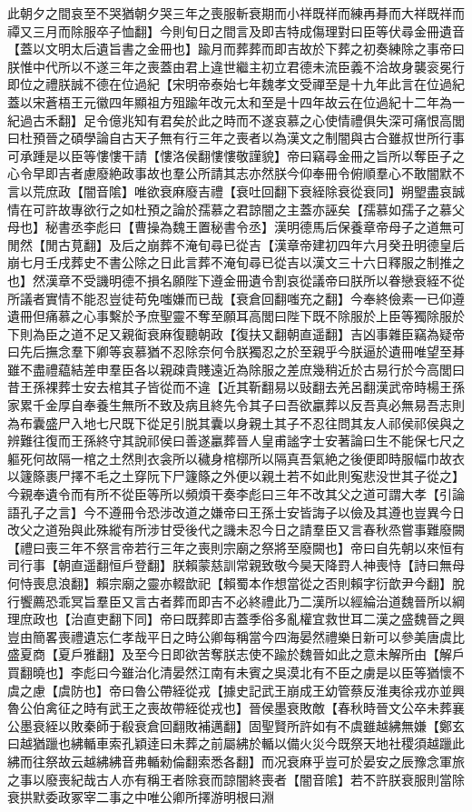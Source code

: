 此朝夕之間哀至不哭猶朝夕哭三年之喪服斬衰期而小祥既祥而練再朞而大祥既祥而禫又三月而除服卒子恤翻】今則旬日之間言及即吉特成傷理對曰臣等伏尋金冊遺音【蓋以文明太后遺旨書之金冊也】踰月而葬葬而即吉故於下葬之初奏練除之事帝曰朕惟中代所以不遂三年之喪蓋由君上違世繼主初立君德未流臣義不洽故身襲衮冕行即位之禮朕誠不德在位過紀【宋明帝泰始七年魏孝文受禪至是十九年此言在位過紀蓋以宋蒼梧王元徽四年顯祖方殂踰年改元太和至是十四年故云在位過紀十二年為一紀過古禾翻】足令億兆知有君矣於此之時而不遂哀慕之心使情禮俱失深可痛恨高閭曰杜預晉之碩學論自古天子無有行三年之喪者以為漢文之制闇與古合雖叔世所行事可承踵是以臣等慺慺干請【慺洛侯翻慺慺敬謹貌】帝曰竊尋金冊之旨所以奪臣子之心令早即吉者慮廢絶政事故也羣公所請其志亦然朕今仰奉冊令俯順羣心不敢闇默不言以荒庶政【闇音隂】唯欲衰麻廢吉禮【衰吐回翻下衰絰除衰從衰同】朔朢盡哀誠情在可許故專欲行之如杜預之論於孺慕之君諒闇之主蓋亦誣矣【孺慕如孺子之慕父母也】秘書丞李彪曰【曹操為魏王置秘書令丞】漢明德馬后保養章帝母子之道無可閒然【閒古莧翻】及后之崩葬不淹旬尋已從吉【漢章帝建初四年六月癸丑明德皇后崩七月壬戌葬史不書公除之日此言葬不淹旬尋已從吉以漢文三十六日釋服之制推之也】然漢章不受譏明德不損名願陛下遵金冊遺令割哀從議帝曰朕所以眷戀衰絰不從所議者實情不能忍豈徒苟免嗤嫌而已哉【衰倉回翻嗤充之翻】今奉終儉素一已仰遵遺冊但痛慕之心事繫於予庶聖靈不奪至願耳高閭曰陛下既不除服於上臣等獨除服於下則為臣之道不足又親䘖衰麻復聽朝政【復扶又翻朝直遥翻】吉凶事雜臣竊為疑帝曰先后撫念羣下卿等哀慕猶不忍除奈何令朕獨忍之於至親乎今朕逼於遺冊唯望至朞雖不盡禮藴結差申羣臣各以親疎貴賤遠近為除服之差庶幾稍近於古易行於今高閭曰昔王孫裸葬士安去棺其子皆從而不違【近其靳翻易以䜴翻去羌呂翻漢武帝時楊王孫家累千金厚自奉養生無所不致及病且終先令其子曰吾欲臝葬以反吾真必無易吾志則為布囊盛尸入地七尺既下從足引脱其囊以身親土其子不忍往問其友人祁侯祁侯與之辨難往復而王孫終守其說祁侯曰善遂臝葬晉人皇甫謐字士安著論曰生不能保七尺之軀死何故隔一棺之土然則衣衾所以穢身棺槨所以隔真吾氣絶之後便即時服幅巾故衣以籧篨裹尸擇不毛之土穿阮下尸籧篨之外便以親土若不如此則寃悲没世其子從之】今親奉遺令而有所不從臣等所以頻煩干奏李彪曰三年不改其父之道可謂大孝【引論語孔子之言】今不遵冊令恐涉改道之嫌帝曰王孫士安皆誨子以儉及其遵也豈異今日改父之道殆與此殊縱有所涉甘受後代之譏未忍今日之請羣臣又言春秋烝嘗事難廢闕【禮曰喪三年不祭言帝若行三年之喪則宗廟之祭將至廢闕也】帝曰自先朝以來恒有司行事【朝直遥翻恒戶登翻】朕賴蒙慈訓常親致敬今昊天降罸人神喪恃【詩曰無母何恃喪息浪翻】賴宗廟之靈亦輟歆祀【賴蜀本作想當從之否則賴字衍歆尹今翻】脫行饗薦恐乖冥旨羣臣又言古者葬而即吉不必終禮此乃二漢所以經綸治道魏晉所以綱理庶政也【治直吏翻下同】帝曰既葬即吉蓋季俗多亂權宜救世耳二漢之盛魏晉之興豈由簡畧喪禮遺忘仁孝哉平日之時公卿每稱當今四海晏然禮樂日新可以參美唐虞比盛夏商【夏戶雅翻】及至今日即欲苦奪朕志使不踰於魏晉如此之意未解所由【解戶買翻曉也】李彪曰今雖治化清晏然江南有未賓之吳漠北有不臣之虜是以臣等猶懷不虞之慮【虞防也】帝曰魯公帶絰從戎【據史記武王崩成王幼管蔡反淮夷徐戎亦並興魯公伯禽征之時有武王之喪故帶絰從戎也】晉侯墨衰敗敵【春秋時晉文公卒未葬襄公墨衰絰以敗秦師于殽衰倉回翻敗補邁翻】固聖賢所許如有不虞雖越紼無嫌【鄭玄曰越猶躐也紼輴車索孔穎逹曰未葬之前屬紼於輴以備火災今既祭天地社稷須越躐此紼而往祭故云越紼紼音弗輴勑倫翻索悉各翻】而况衰麻乎豈可於晏安之辰豫念軍旅之事以廢喪紀哉古人亦有稱王者除衰而諒闇終喪者【闇音隂】若不許朕衰服則當除衰拱默委政冢宰二事之中唯公卿所擇游明根曰淵